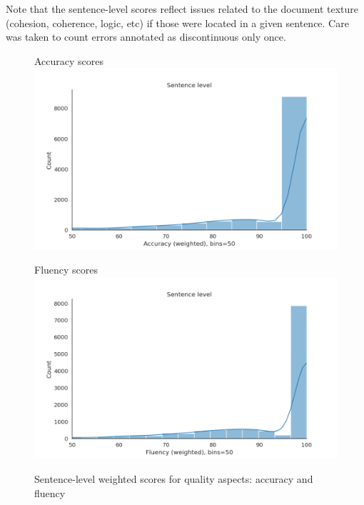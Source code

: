 Note that the sentence-level scores reflect issues related to the document texture (cohesion, coherence, logic, etc) if those were located in a given sentence. Care was taken to count errors annotated as discontinuous only once.
\label{pg:skews}
\begin{figure}[H]
	\begin{minipage}[c]{0.5\linewidth}	
		\centering
		Accuracy scores
		\includegraphics[width=\textwidth]{figures/err/sent-accuracy-major2critical5weighted}	
	\end{minipage}
	\begin{minipage}[c]{0.5\linewidth}
		\centering
		Fluency scores
		\includegraphics[width=\textwidth]{figures/err/sent-fluency-major2critical5weighted}
	\end{minipage}
	\caption{\label{fig:sents_weighed_aspects}Sentence-level weighted scores for quality aspects: accuracy and fluency}
\end{figure}

